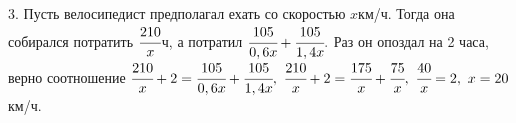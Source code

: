 3. Пусть велосипедист предполагал ехать со скоростью $x$км/ч. Тогда она собирался потратить $\cfrac{210}{x}$ч, а потратил $\cfrac{105}{0,6x}+\cfrac{105}{1,4x}.$ Раз он опоздал на 2 часа, верно соотношение $\cfrac{210}{x}+2=\cfrac{105}{0,6x}+\cfrac{105}{1,4x},\ \cfrac{210}{x}+2=\cfrac{175}{x}+\cfrac{75}{x},\ \cfrac{40}{x}=2,\ x=20$км/ч.\\
